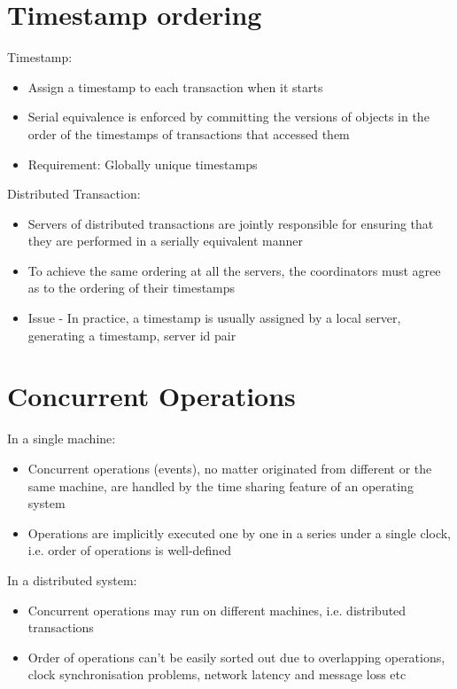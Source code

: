 \documentclass{article}[18pt]
\begin{document}
\section{Timestamp ordering}
Timestamp:
\begin{itemize}
	\item Assign a timestamp to each transaction when it starts
	\item Serial equivalence is enforced by committing the versions of objects in the order of the timestamps of transactions that accessed them
	\item Requirement: Globally unique timestamps
\end{itemize}
Distributed Transaction:
\begin{itemize}
	\item Servers of distributed transactions are jointly responsible for ensuring that they are performed in a serially equivalent manner
	\item To achieve the same ordering at all the servers, the coordinators must agree as to the ordering of their timestamps
	\item Issue - In practice, a timestamp is usually assigned by a local server, generating a timestamp, server id pair
\end{itemize}
\section{Concurrent Operations}
In a single machine:
\begin{itemize}
	\item Concurrent operations (events), no matter originated from different or the same machine, are handled by the time sharing feature of an operating system
	\item Operations are implicitly executed one by one in a series under a single clock, i.e. order of operations is well-defined
\end{itemize}
In a distributed system:
\begin{itemize}
	\item Concurrent operations may run on different machines, i.e. distributed transactions
	\item Order of operations can't be easily sorted out due to overlapping operations, clock synchronisation problems, network latency and message loss etc
\end{itemize}
\end{document}

